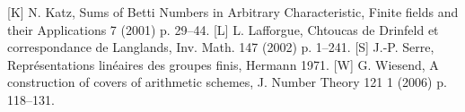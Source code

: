 \documentclass[11pt]{article}
\begin{document}
[K] N. Katz, Sums of Betti Numbers in Arbitrary Characteristic, Finite fields and their Applications 7 (2001) p. 29--44. [L] L. Lafforgue, Chtoucas de Drinfeld et correspondance de Langlands, Inv. Math. 147 (2002) p. 1--241. [S] J.-P. Serre, Représentations linéaires des groupes finis, Hermann 1971. [W] G. Wiesend, A construction of covers of arithmetic schemes, J. Number Theory 121 1 (2006) p. 118--131.
\end{document}
